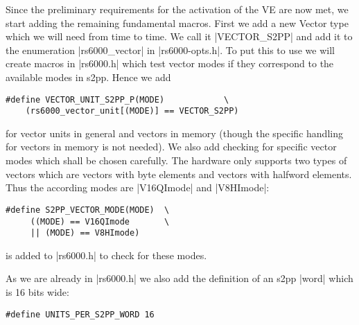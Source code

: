 Since the preliminary requirements for the activation of the VE are now met, we start adding the remaining fundamental macros.
First we add a new Vector type which we will need from time to time.
We call it |VECTOR_S2PP| and add it to the enumeration |rs6000_vector| in |rs6000-opts.h|.
To put this to use we will create macros in |rs6000.h| which test vector modes if they correspond to the available modes in s2pp.
Hence we add 
\begin{lstlisting}
#define VECTOR_UNIT_S2PP_P(MODE)            \
    (rs6000_vector_unit[(MODE)] == VECTOR_S2PP)
\end{lstlisting}
for vector units in general and vectors in memory (though the specific handling for vectors in memory is not needed). 
We also add checking for specific vector modes which shall be chosen carefully.
The hardware only supports two types of vectors which are vectors with byte elements and vectors with halfword elements.
Thus the according modes are |V16QImode| and |V8HImode|:\todo{necessary?}
\begin{lstlisting}
#define S2PP_VECTOR_MODE(MODE)  \
     ((MODE) == V16QImode       \
     || (MODE) == V8HImode)
\end{lstlisting}
is added to |rs6000.h| to check for these modes.

As we are already in |rs6000.h| we also add the definition of an s2pp |word| which is 16 bits wide:
\begin{lstlisting}
#define UNITS_PER_S2PP_WORD 16
\end{lstlisting}


